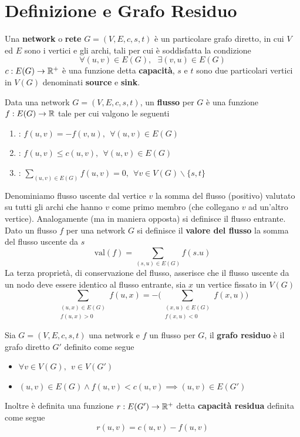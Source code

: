 \documentclass[10pt, letterpaper]{report}
\begin{document}
\section{Definizione e Grafo Residuo}
\begin{definizione}
    Una \textbf{network} o \textbf{rete} $G=(V,E,c,s,t)$ è un particolare grafo diretto, in cui $V$ ed $E$ sono i vertici e gli archi, tali per cui è soddisfatta la condizione 
    $$\forall (u,v)\in E(G), \ \ \ \exists (v,u)\in E(G) $$
    $c:E(G)\rightarrow{\mathbb R}^+$ è una funzione detta \textbf{capacità}, $s$ e $t$ sono due particolari vertici in $V(G)$ denominati \textbf{source} e \textbf{sink}.
\end{definizione}
\begin{definizione}
    Data una network $G=(V,E,c,s,t)$, un \textbf{flusso} per $G$ è una funzione $f:E(G)\rightarrow{\mathbb R}$ tale per cui valgono le seguenti\begin{enumerate}
        \item {} : $f(u,v)=-f(v,u), \ \ \forall (u,v)\in E(G)$ 
        \item {} : $f(u,v)\le c(u,v), \ \ \forall (u,v)\in E(G)$ 
        \item {} : $\displaystyle\sum_{(u,v)\in E(G)}f(u,v)=0, \ \ \forall v\in V(G)\backslash\{s,t\}$ 
    \end{enumerate}
\end{definizione}
Denominiamo flusso uscente dal vertice $v$ la somma del flusso (positivo) valutato su tutti gli archi che hanno $v$ come primo membro (che collegano $v$ ad un'altro vertice). Analogamente (ma in maniera opposta) si definisce il flusso entrante.
Dato un flusso $f$ per una network $G$ si definisce il \textbf{valore del flusso} la somma del flusso uscente da $s$ 
$$ \text{val}(f)=\sum_{(s,u)\in E(G)}f(s.u)$$
La terza proprietà, di conservazione del flusso, asserisce che il flusso uscente da un nodo deve essere identico al flusso entrante, sia $x$ un vertice fissato in $V(G)$
$$ \sum_{\begin{matrix}(u,x)\in E(G)\\f(u,x)>0\end{matrix}}f(u,x)=-\Bigg(
\sum_{\begin{matrix}(x,u)\in E(G)\\f(x,u)<0\end{matrix}}f(x,u)\Bigg)$$
\begin{definizione}
    Sia $G=(V,E,c,s,t)$ una network e $f$ un flusso per $G$, il \textbf{grafo residuo} è il grafo diretto $G'$ definito come segue\begin{itemize}
        \item $\forall v\in V(G), \ \ v\in V(G')$
        \item $(u,v)\in E(G)\land f(u,v)<c(u,v)\implies (u,v)\in E(G')$
    \end{itemize}
    Inoltre è definita una funzione $r:E(G')\rightarrow {\mathbb R}^+$ detta \textbf{capacità residua} definita come segue $$ r(u,v)=c(u,v)-f(u,v)$$
\end{definizione}
\end{document}
